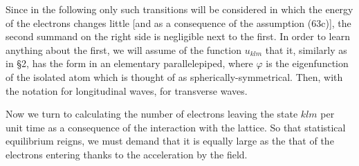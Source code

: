 \begin{paper}{1}
Since in the following only such transitions will be considered in which the energy of the electrons changes little [and as a consequence of the assumption (63c)], the second summand on the right side is negligible next to the first. In order to learn anything about the first, we will assume of the function $u_{klm}$ that it, similarly as in \S2, has the form
in an elementary parallelepiped, where $\varphi$ is the eigenfunction of the isolated atom which is thought of as spherically-symmetrical. Then, with the notation
for longitudinal waves,
for transverse waves.

Now we turn to calculating the number of electrons leaving the state $klm$ per unit time as a consequence of the interaction with the lattice. So that statistical equilibrium reigns, we must demand that it is equally large as the that of the electrons entering thanks to the acceleration by the field.


\end{paper}
